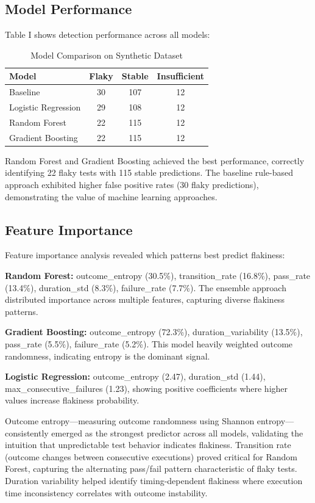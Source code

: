 \documentclass[conference]{IEEEtran}
\begin{document}
\subsection{Model Performance}
Table I shows detection performance across all models:

\begin{table}[h]
\centering
\caption{Model Comparison on Synthetic Dataset}
\begin{tabular}{|l|c|c|c|}
\hline
\textbf{Model} & \textbf{Flaky} & \textbf{Stable} & \textbf{Insufficient} \\
\hline
Baseline & 30 & 107 & 12 \\
Logistic Regression & 29 & 108 & 12 \\
Random Forest & 22 & 115 & 12 \\
Gradient Boosting & 22 & 115 & 12 \\
\hline
\end{tabular}
\end{table}

Random Forest and Gradient Boosting achieved the best performance, correctly identifying 22 flaky tests with 115 stable predictions. The baseline rule-based approach exhibited higher false positive rates (30 flaky predictions), demonstrating the value of machine learning approaches.

\subsection{Feature Importance}
Feature importance analysis revealed which patterns best predict flakiness:

\textbf{Random Forest:} outcome\_entropy (30.5\%), transition\_rate (16.8\%), pass\_rate (13.4\%), duration\_std (8.3\%), failure\_rate (7.7\%). The ensemble approach distributed importance across multiple features, capturing diverse flakiness patterns.

\textbf{Gradient Boosting:} outcome\_entropy (72.3\%), duration\_variability (13.5\%), pass\_rate (5.5\%), failure\_rate (5.2\%). This model heavily weighted outcome randomness, indicating entropy is the dominant signal.

\textbf{Logistic Regression:} outcome\_entropy (2.47), duration\_std (1.44), max\_consecutive\_failures (1.23), showing positive coefficients where higher values increase flakiness probability.

Outcome entropy—measuring outcome randomness using Shannon entropy—consistently emerged as the strongest predictor across all models, validating the intuition that unpredictable test behavior indicates flakiness. Transition rate (outcome changes between consecutive executions) proved critical for Random Forest, capturing the alternating pass/fail pattern characteristic of flaky tests. Duration variability helped identify timing-dependent flakiness where execution time inconsistency correlates with outcome instability.
\end{document}
